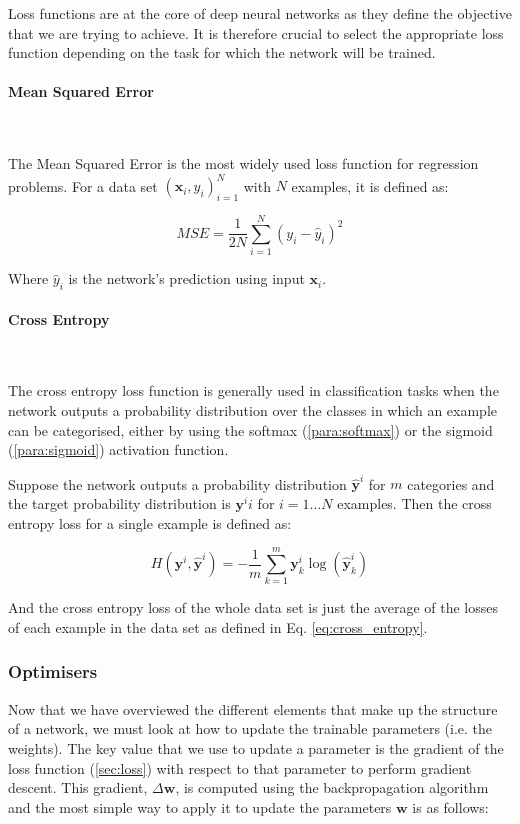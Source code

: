 \documentclass[12pt,twoside]{article}
\newcommand{\para}[1]{\paragraph{#1}\mbox{}\\}
\begin{document}
Loss functions are at the core of deep neural networks as they define the
objective that we are trying to achieve. It is therefore crucial to select
the appropriate loss function depending on the task for which the network will
be trained.

\para{Mean Squared Error}\label{para:mse}

The Mean Squared Error is the most widely used loss function for regression
problems. For a data set $\left( \bm{x}_i, y_i \right)_{i=1}^N$ with $N$
examples, it is defined as:

\begin{equation}
  MSE = \frac{1}{2N}\sum_{i=1}^N (y_i - \hat{y}_i)^2
  \label{eq:mse}
\end{equation}

Where $\hat{y}_i$ is the network's prediction using input $\bm{x}_i$.

\para{Cross Entropy}\label{para:cross_entropy}

The cross entropy loss function is generally used in classification tasks when
the network outputs a probability distribution over the classes in which an
example can be categorised, either by using the softmax (\ref{para:softmax}) or the
sigmoid (\ref{para:sigmoid}) activation function.

Suppose the network outputs a probability distribution $\hat{\bm{y}}^i$ for
$m$ categories and the target
probability distribution is $\bm{y}^ii$ for $i=1\dots N$ examples. 
Then the cross entropy loss for a single example is defined as:

\begin{equation}
  H(\bm{y}^i, \hat{\bm{y}}^i) = -\frac{1}{m} \sum_{k=1}^m \bm{y}_k^i
  \log(\hat{\bm{y}}_k^i)
  \label{eq:cross_entropy}
\end{equation}

And the cross entropy loss of the whole data set is just the average of the
losses of each example in the data set as defined in Eq.
\eqref{eq:cross_entropy}.

\subsubsection{Optimisers}\label{sec:optimisers}

Now that we have overviewed the different elements that make up the structure
of a network, we must look at how to update the trainable parameters (i.e. the
weights). The key value that we use to update a parameter is the gradient of the loss function
(\ref{sec:loss}) with respect to that parameter to perform gradient descent.
This gradient,  $\Delta\bm{w}$, is computed using the backpropagation algorithm and
the most simple way to apply it to update the parameters $\bm{w}$ is as follows:
\end{document}
